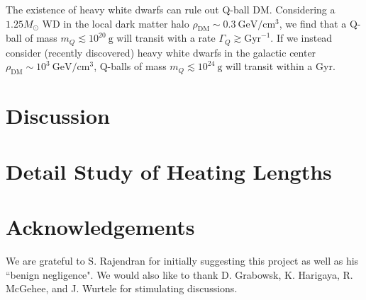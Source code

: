 \documentclass[twocolumn,showpacs,preprintnumbers,amsmath,amssymb,prd]{revtex4}
\begin{document}
The existence of heavy white dwarfs can rule out Q-ball DM. Considering a $1.25 M_{\odot}$ WD in the local dark matter halo $\rho_{\text{DM}} \sim 0.3 ~\text{GeV}/\text{cm}^3$, we find that a Q-ball of mass $m_Q \lesssim 10^{20} ~\text{g}$ will transit with a rate $\Gamma_Q \gtrsim \text{Gyr}^{-1}$. If we instead consider (recently discovered) heavy white dwarfs in the galactic center $\rho_{\text{DM}} \sim 10^3 ~\text{GeV}/\text{cm}^3$, Q-balls of mass $m_Q \lesssim 10^{24} ~\text{g}$ will transit within a Gyr.

\section{Discussion}

\appendix

\section{Detail Study of Heating Lengths}
\label{app:heatinglengthfull}

\section{Acknowledgements}
We are grateful to S. Rajendran for initially suggesting this project as well as his ``benign negligence". We would also like to thank D. Grabowsk, K. Harigaya, R. McGehee, and J. Wurtele for stimulating discussions.


\end{document}
